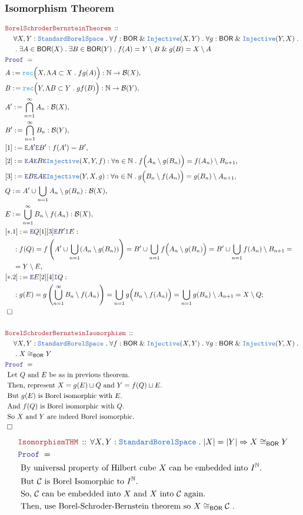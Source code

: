 \documentclass[12pt]{scrartcl}
\newcommand{\TYPE}[1]{\textcolor{NavyBlue}{\mathtt{#1}}}
\newcommand{\FUNC}[1]{\textcolor{Cerulean}{\mathtt{#1}}}
\newcommand{\LOGIC}[1]{\textcolor{Blue}{\mathtt{#1}}}
\newcommand{\THM}[1]{\textcolor{Maroon}{\mathtt{#1}}}
\renewcommand{\.}{\; . \;}
\newcommand{\de}{: \kern 0.1pc =}
\newcommand{\Theorem}[2]{& \THM{#1} \, :: \, #2 \\ & \Proof = \\ }
\newcommand{\NewLine}{\\ & \kern 1pc}
\newcommand{\Page}[1]{ \begin{align*} #1 \end{align*}   }
\renewcommand{\And}{\; \& \;}
\newcommand{\Imply}{\Rightarrow}
\newcommand{\Intro}{\LOGIC{I}}
\newcommand{\Elim}{\LOGIC{E}}
\newcommand{\Nat}{\mathbb{N} }
\newcommand{\Say}[3]{& #1 \de #2 : #3, \\}
\newcommand{\Conclude}[3]{& #1 \de #2 : #3; \\}
\newcommand{\QED}{\; \square}
\newcommand{\EndProof}{& \QED \\}
\newcommand{\Proof}{\LOGIC{Proof} \; }
\newcommand{\Explain}[1]{& \text{#1.} \\}
\newcommand{\Inj}{\TYPE{Injective}}
\newcommand{\C}{\mathcal{C}}
\newcommand{\B}{\mathcal{B}}
\newcommand{\SBS}{\TYPE{StandardBorelSpace}}
\newcommand{\BOR}{\mathsf{BOR}}
\begin{document}
\subsubsection{Isomorphism Theorem}
\Page{
	\Theorem{BorelSchroderBernsteinTheorem}
	{
		\NewLine 		
		\forall X,Y : \SBS \.
		\forall f : \BOR \And \Inj(X,Y) \.
		\forall g : \BOR \And \Inj(Y,X) \. \NewLine \.
		\exists A \in \BOR(X) \.
		\exists B \in \BOR(Y) \.
		f(A) =  Y \setminus B  \And
		g(B) = X \setminus A
	}
	\Say{A}{\FUNC{rec}\Big(X, \Lambda A \subset X \. fg(A) \Big)}{\Nat \to \B(X)}
	\Say{B}{\FUNC{rec}\Big(Y, \Lambda B \subset Y \. gf(B) \Big)}{\Nat \to \B(Y)}
	\Say{A'}{\bigcap^\infty_{n=1} A_n}{\B(X)}
	\Say{B'}{\bigcap^\infty_{n=1} B_n}{\B(Y)}
	\Say{[1]}{\Elim A' \Elim B'}{f(A') = B'}
	\Say{[2]}{\Elim A \Elim B \Elim \Inj(X,Y,f)}
	{
		\forall n \in \Nat \.
		f\Big( A_n \setminus g(B_n) \Big) =
		f(A_n) \setminus B_{n+1}
	}
	\Say{[3]}{\Elim B \Elim A \Elim \Inj(Y,X,g)}
	{
		\forall n \in \Nat \.
		g\Big( B_n \setminus f(A_n) \Big) =
		g(B_n) \setminus A_{n+1}
	}
	\Say{Q}{A' \cup \bigcup_{n=1}A_n \setminus g(B_n)}{\B(X)}
	\Say{E}{\bigcup^\infty_{n=1} B_n \setminus f(A_{n})}{\B(X)}
	\Say{[*.1]}{
		\Elim Q  [1][3] \Elim B' \Intro E	
	}
	{
		\NewLine :		
		f(Q) =
		f\left( A' \cup \bigcup_{n=1}(A_n \setminus g(B_n))\right) =
		B' \cup  \bigcup_{n=1} f\Big(A_n \setminus g(B_n)\Big) =
		B' \cup \bigcup_{n=1} f(A_{n}) \setminus B_{n+1} = \NewLine =
		Y \setminus E
	}
	\Conclude{[*.2]}{
		\Elim E  [2][4]  \Intro Q	
	}
	{
		\NewLine :		
		g(E) =
		g\left( \bigcup^\infty_{n=1} B_n \setminus f(A_{n})  \right) =
		\bigcup_{n=1} g\Big(B_n \setminus f(A_n)\Big) =
		\bigcup_{n=1} g(B_{n}) \setminus A_{n+1} = 
		X \setminus Q
	}		
	\EndProof
	\\
	\Theorem{BorelSchroderBernsteinIsomorphism}
	{
		\NewLine 		
		\forall X,Y : \SBS \.
		\forall f : \BOR \And \Inj(X,Y) \.
		\forall g : \BOR \And \Inj(Y,X) \. \NewLine \.
		X \cong_\BOR Y
	}
	\Explain{ Let $Q$ and $E$ be as in previous theorem}
	\Explain{ Then, represent $X = g(E) \sqcup Q$ and $Y = f(Q) \sqcup E$}
	\Explain{ But $g(E)$ is Borel isomorphic with $E$}
	\Explain{ And $f(Q)$ is Borel isomorphic with $Q$}
	\Explain{ So $X$ and $Y$ are indeed Borel isomorphic}
	\EndProof
}\Page{
	\Theorem{IsomorphismTHM}
	{
		\forall X,Y : \SBS \.
		|X| = |Y| \Imply X \cong_\BOR Y
	}
	\Explain{ By universal property of Hilbert cube $X$ can be embedded into $I^\Nat$}
	\Explain{ But $\C$ is Borel Isomorphic to $I^\Nat$}
	\Explain{ So, $\C$ can be embedded into $X$ and $X$ into $\C$ again}
	\Explain{ Then, use Borel-Schroder-Bernstein theorem so $X \cong_\BOR \C$ }
}
\end{document}
